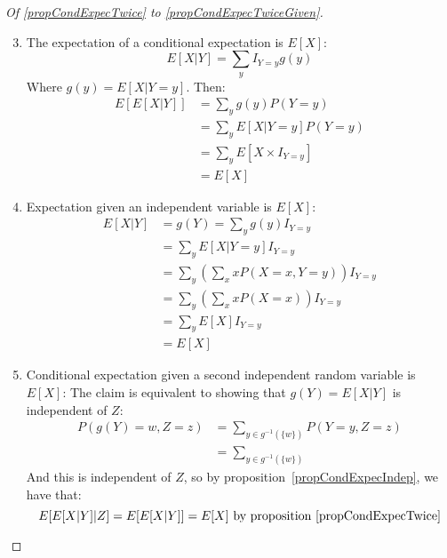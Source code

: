 \documentclass[../Main.tex]{subfiles}
\begin{document}
\begin{proof}[Of \ref{propCondExpecTwice} to \ref{propCondExpecTwiceGiven}]
    \begin{enumerate}
        \setcounter{enumi}{2} %
        \item The expectation of a conditional expectation is $E[X]$:
            \begin{equation*}
                E[X | Y] = \sum_y I_{Y = y} g(y)
            \end{equation*}
            Where $g(y) = E[X | Y = y]$. Then:
            \begin{align*}
                E[E[X | Y]] &= \sum_y g(y) P(Y = y) \\
                &= \sum_y E[X | Y = y] P(Y = y) \\
                &= \sum_y E[X \times I_{Y = y}] \\
                &= E[X]
            \end{align*}
        \item Expectation given an independent variable is $E[X]$:
            \begin{align*}
                E[X | Y] &= g(Y) = \sum_y g(y) I_{Y = y} \\
                &= \sum_y E[X | Y = y] I_{Y = y} \\
                &= \sum_y \left(\sum_x x P(X = x, Y = y)\right) I_{Y = y} \\
                &= \sum_y \left(\sum_x x P(X = x)\right) I_{Y = y} \\
                &= \sum_y E[X] I_{Y = y} \\
                &= E[X]
            \end{align*}
        \item Conditional expectation given a second independent random variable is $E[X]$:
            The claim is equivalent to showing that $g(Y) = E[X | Y]$ is independent of $Z$:
            \begin{align*}
                P(g(Y) = w, Z = z) &= \sum_{y \in g^{-1}(\{w\})} P(Y = y, Z = z) \\
                &= \sum_{y \in g^{-1}(\{w\})}
            \end{align*}
            And this is independent of $Z$, so by proposition~\ref{propCondExpecIndep}, we have that:
            \begin{equation*}
                E[E[X | Y] | Z] = E[E[X | Y]] = E[X] \text{ by proposition~\ref{propCondExpecTwice}}
            \end{equation*}

\end{enumerate}
\end{proof}
\end{document}
